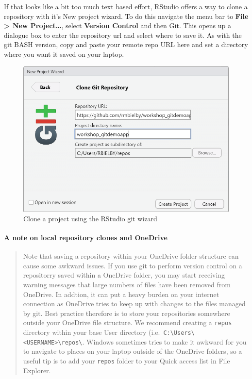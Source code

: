 \documentclass[
  12pt,
]{article}
\begin{document}
If that looks like a bit too much text based effort, RStudio offers a
way to clone a repository with it's New project wizard. To do this
navigate the menu bar to \textbf{File \textgreater{} New
Project\ldots{}}, select \textbf{Version Control} and then Git. This
opens up a dialogue box to enter the repository url and select where to
save it. As with the git BASH version, copy and paste your remote repo
URL here and set a directory where you want it saved on your laptop.

\begin{figure}
\includegraphics[width=0.6\linewidth]{images/gitdemo/gitdemo-RStudio_OpenProj_wizard} \caption{Clone a project using the RStudio git wizard}\label{fig:unnamed-chunk-7}
\end{figure}

\hypertarget{a-note-on-local-repository-clones-and-onedrive}{%
\paragraph{A note on local repository clones and
OneDrive}\label{a-note-on-local-repository-clones-and-onedrive}}

\begin{quote}
Note that saving a repository within your OneDrive folder structure can
cause some awkward issues. If you use git to perform version control on
a repositorry saved within a OneDrive folder, you may start receiving
warning messages that large numbers of files have been removed from
OneDrive. In addtion, it can put a heavy burden on your internet
connection as OneDrive tries to keep up with changes to the files
managed by git. Best practice therefore is to store your repositories
somewhere outside your OneDrive file structure. We recommend creating a
\texttt{repos} directory within your base User directory
(i.e.~\texttt{C:\textbackslash{}Users\textbackslash{}\textless{}USERNAME\textgreater{}\textbackslash{}repos\textbackslash{}}.
Windows sometimes tries to make it awkward for you to navigate to places
on your laptop outside of the OneDrive folders, so a useful tip is to
add your \texttt{repos} folder to your Quick access list in File
Explorer.
\end{quote}
\end{document}
